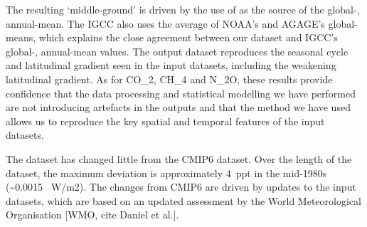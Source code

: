 The resulting `middle-ground' is driven by the use of \citet{wmo_ozone-ch7_2022} as the source of the global-, annual-mean.
The IGCC also uses the average of NOAA's and AGAGE's global-means,
which explains the close agreement between our dataset and IGCC's global-, annual-mean values.
The output dataset reproduces the seasonal cycle and latitudinal gradient seen in the input datasets,
including the weakening latitudinal gradient.
As for CO_2, CH_4 and N_2O,
these results provide confidence that the data processing and statistical modelling we have performed are not introducing artefacts in the outputs
and that the method we have used allows us to reproduce the key spatial and temporal features of the input datasets.

The dataset has changed little from the CMIP6 dataset.
Over the length of the dataset, the maximum deviation is approximately 4~ppt in the mid-1980s (\textasciitilde{}0.0015~ W/m2).
The changes from CMIP6 are driven by updates to the input datasets,
which are based on an updated assessment by the World Meteorological Organisation [WMO, cite Daniel et al.].

